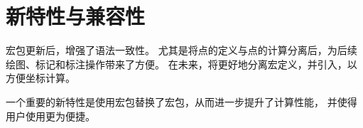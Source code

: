 \documentclass[../main.tex]{subfiles}
\begin{document}
\section{新特性与兼容性}

宏包更新后，增强了语法一致性。
尤其是将点的定义与点的计算分离后，为后续绘图、标记和标注操作带来了方便。
在未来，将更好地分离宏定义，并引入，以方便坐标计算。


一个重要的新特性是使用宏包替换了宏包，从而进一步提升了计算性能，
并使得用户使用更为便捷。
\end{document}
